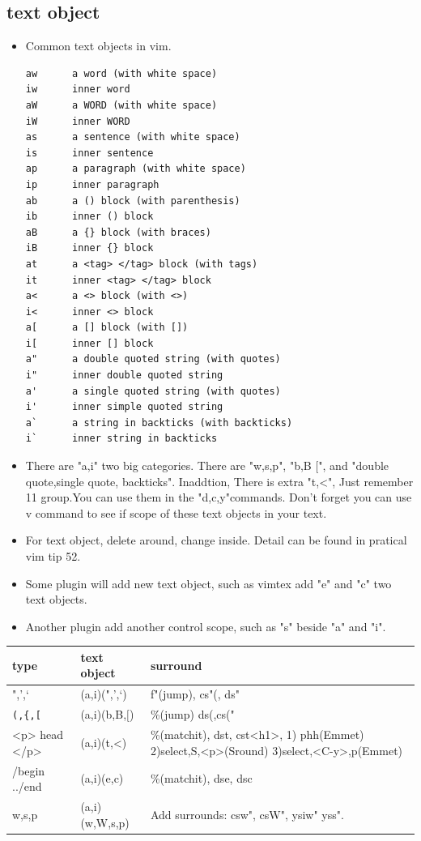 \documentclass[a4paper,12pt,twoside]{book}
\begin{document}
\subsection{text object}
\begin{itemize}
		\item Common text objects in vim. 
\begin{verbatim}
aw		a word (with white space)
iw		inner word
aW		a WORD (with white space)
iW		inner WORD
as		a sentence (with white space)
is		inner sentence
ap		a paragraph (with white space)
ip		inner paragraph
ab		a () block (with parenthesis)
ib		inner () block
aB		a {} block (with braces)
iB		inner {} block
at		a <tag> </tag> block (with tags)
it		inner <tag> </tag> block
a<		a <> block (with <>)
i<		inner <> block
a[		a [] block (with [])
i[		inner [] block
a"		a double quoted string (with quotes)
i"		inner double quoted string
a'		a single quoted string (with quotes)
i'		inner simple quoted string
a`		a string in backticks (with backticks)
i`		inner string in backticks
\end{verbatim}
\item There are "a,i" two big categories. There are "w,s,p", "b,B $[$", and "double quote,single quote, backticks". Inaddtion, There is extra "t,<", Just remember 11 group.You can use them in the "d,c,y"commands. Don't forget you can use v command to see if scope of these text objects in your text.  

\item For text object,  delete around, change inside. Detail can be found in pratical vim tip 52. 
\item Some plugin will add new text object, such as vimtex add "e" and "c" two text objects. 
\item Another plugin add another control scope, such as "s" beside "a" and "i". 
\end{itemize}

\begin{tabular}{p{}|p{}|p{}}
\hline 
type & text object & surround \\

\hline 
",',`  & (a,i)(",',`) & f"(jump), cs"(, ds" \\

\hline 
\verb=(,{,[= & (a,i)(b,B,$[$) & \%(jump) ds(,cs("  \\

\hline 
<p> head </p> & (a,i)(t,<) & \%(matchit), dst, cst<h1>, 1) phh(Emmet) 2)select,S,<p>(Sround) 3)select,<C-y>,p(Emmet) \\

\hline
/begin ../end & (a,i)(e,c) & \%(matchit), dse, dsc \\

\hline 
w,s,p & (a,i)(w,W,s,p) & Add surrounds: csw", csW", ysiw" yss".  \\

\hline 
\end{tabular}
\end{document}
